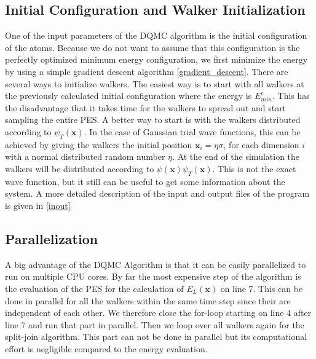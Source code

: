 \documentclass [12pt]{report}
\begin{document}
\subsection{Initial Configuration and Walker Initialization}
One of the input parameters of the DQMC algorithm is the initial configuration of the atoms. Because we do not want to assume that this configuration is the perfectly optimized minimum energy configuration, we first minimize the energy by using a simple gradient descent algorithm \ref{gradient_descent}.
There are several ways to initialize walkers. The easiest way is to start with all walkers at the previously calculated initial configuration where the energy is $E^e_{min}$. This has the disadvantage that it takes time for the walkers to spread out and start sampling the entire PES. A better way to start  is with the walkers distributed according to $\psi_T(\bm{x})$. In the case of Gaussian trial wave functions, this can be achieved by giving the walkers the initial position $\bm{x}_i = \eta \sigma_i$ for each dimension $i$ with a normal distributed random number $\eta$.
At the end of the simulation the walkers will be distributed according to $\psi(\bm{x})\psi_T(\bm{x})$. This is not the exact wave function, but it still can be useful to get some information about the system. A more detailed description of the input and output files of the program is given in \ref{inout}
\subsection{Parallelization}
A big advantage of the DQMC Algorithm is that it can be easily parallelized to run on multiple CPU cores. By far the most expensive step of the algorithm is the evaluation of the PES for the calculation of $E_L(\bm{x})$ on line 7. This can be done in parallel for all the walkers within the same time step since their are independent of each other. We therefore close the for-loop starting on line 4 after line 7 and run that part in parallel. Then we loop over all walkers again for the split-join algorithm. This part can not be done in parallel but its computational effort is negligible compared to the energy evaluation.
\end{document}
